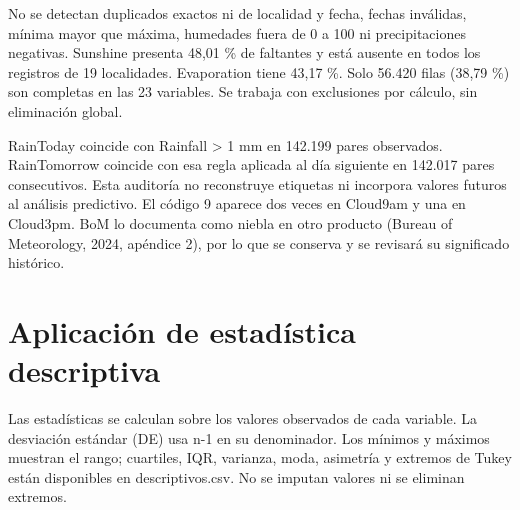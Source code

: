 \documentclass[11pt,a4paper]{article}
\begin{document}
No se detectan duplicados exactos ni de localidad y fecha, fechas inválidas, mínima mayor que máxima, humedades fuera de 0 a 100 ni precipitaciones negativas. Sunshine presenta 48,01 \% de faltantes y está ausente en todos los registros de 19 localidades. Evaporation tiene 43,17 \%. Solo 56.420 filas (38,79 \%) son completas en las 23 variables. Se trabaja con exclusiones por cálculo, sin eliminación global.


RainToday coincide con Rainfall > 1 mm en 142.199 pares observados. RainTomorrow coincide con esa regla aplicada al día siguiente en 142.017 pares consecutivos. Esta auditoría no reconstruye etiquetas ni incorpora valores futuros al análisis predictivo. El código 9 aparece dos veces en Cloud9am y una en Cloud3pm. BoM lo documenta como niebla en otro producto (Bureau of Meteorology, 2024, apéndice 2), por lo que se conserva y se revisará su significado histórico.


\clearpage


\section{Aplicación de estadística descriptiva}

Las estadísticas se calculan sobre los valores observados de cada variable. La desviación estándar (DE) usa n-1 en su denominador. Los mínimos y máximos muestran el rango; cuartiles, IQR, varianza, moda, asimetría y extremos de Tukey están disponibles en descriptivos.csv. No se imputan valores ni se eliminan extremos.
\end{document}
